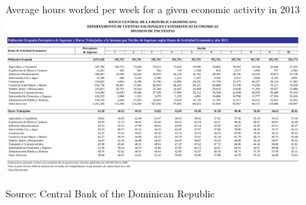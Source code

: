 \documentclass[12pt]{article}
\begin{document}
\begin{landscape}
\begin{figure}[H]
\begin{center}
Average  hours worked per week for a given economic activity in 2013
\includegraphics[scale=1,keepaspectratio=true]{../Plots/AvgHoursOcc2013.pdf}
\caption{\label{fig:Appendix4}}
Source: Central Bank of the Dominican Republic
\end{center}
\end{figure}
\end{landscape}
\end{document}
